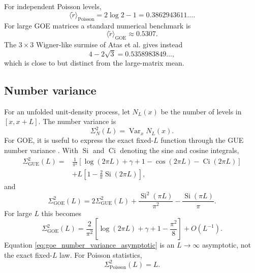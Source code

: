 \documentclass[11pt]{amsart}
\numberwithin{equation}{section}
\theoremstyle{plain}
\theoremstyle{definition}
\theoremstyle{remark}
\newcommand{\GOE}{\mathrm{GOE}}
\newcommand{\GUE}{\mathrm{GUE}}
\newcommand{\Poisson}{\mathrm{Poisson}}
\newcommand{\Var}{\operatorname{Var}}
\begin{document}
For independent Poisson levels,
\begin{equation}
\langle\widetilde r\rangle_{\Poisson}
=2\log 2-1
=0.3862943611\ldots.
\label{eq:poisson_gap_ratio}
\end{equation}
For large GOE matrices a standard numerical benchmark is
\begin{equation}
\langle\widetilde r\rangle_{\GOE}\approx0.5307.
\label{eq:goe_gap_ratio}
\end{equation}
The $3\times3$ Wigner-like surmise of Atas et al. gives instead
\begin{equation}
4-2\sqrt3=0.5358983849\ldots,
\label{eq:atas_gap_ratio}
\end{equation}
which is close to but distinct from the large-matrix mean.

\subsection{Number variance}
\label{subsec:number_variance}

For an unfolded unit-density process, let $N_L(x)$ be the number of levels in $[x,x+L]$.  The number variance is
\begin{equation}
\Sigma_N^2(L)=\Var_x N_L(x).
\label{eq:number_variance_definition}
\end{equation}
For GOE, it is useful to express the exact fixed-$L$ function through the GUE number variance \cite{Mehta2004,BGS1984}.  With $\operatorname{Si}$ and $\operatorname{Ci}$ denoting the sine and cosine integrals,
\begin{align}
\Sigma_{\GUE}^2(L)
={}&\frac{1}{\pi^2}
\left[
\log(2\pi L)+\gamma+1-\cos(2\pi L)-\operatorname{Ci}(2\pi L)
\right]
\label{eq:gue_number_variance_first}\\
&+L\left[1-\frac{2}{\pi}\operatorname{Si}(2\pi L)\right],
\label{eq:gue_number_variance_second}
\end{align}
and
\begin{equation}
\Sigma_{\GOE}^2(L)
=
2\Sigma_{\GUE}^2(L)
+
\frac{\operatorname{Si}^2(\pi L)}{\pi^2}
-
\frac{\operatorname{Si}(\pi L)}{\pi}.
\label{eq:goe_number_variance_exact}
\end{equation}
For large $L$ this becomes
\begin{equation}
\Sigma_{\GOE}^2(L)
=
\frac{2}{\pi^2}
\left[
\log(2\pi L)+\gamma+1-\frac{\pi^2}{8}
\right]
+O(L^{-1}).
\label{eq:goe_number_variance_asymptotic}
\end{equation}
Equation \eqref{eq:goe_number_variance_asymptotic} is an $L\to\infty$ asymptotic, not the exact fixed-$L$ law.  For Poisson statistics,
\begin{equation}
\Sigma_{\Poisson}^2(L)=L.
\label{eq:poisson_number_variance}
\end{equation}
\end{document}
